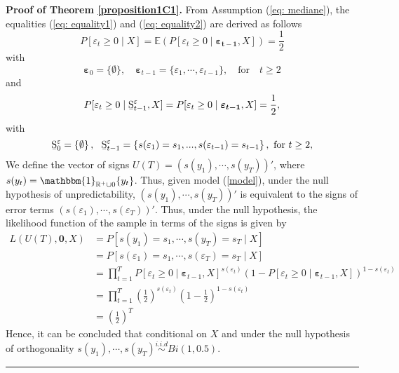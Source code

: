\documentclass[harvard,11pt]{article}
\newcommand{\E}{\mathbb{E}}
\newenvironment{proof}[1][Proof]{\textbf{#1.} }{\  \rule{0.5em}{0.5em}}
\begin{document}
\begin{proof}[Proof of Theorem \protect\ref{proposition1C1}]
 From Assumption (\ref{eq: mediane}), the equalities (\ref{eq: equality1}) and (\ref{eq: equality2}) are derived as follows
\begin{equation}\label{eq: equality1}
P[\varepsilon_t\geq0\mid X]=\E\left(P[\varepsilon_t\geq 0\mid\bm{\varepsilon_{t-1}},X ]\right)=\frac{1}{2}
\end{equation}
with
\[
\bm{\varepsilon}_0=\{\emptyset\},\quad \bm{\varepsilon}_{t-1}=\{\varepsilon_1,\cdots,\varepsilon_{t-1}\},\quad\text{for}\quad t\geq 2
\]
and
\begin{equation}\label{eq: equality2}
P[\varepsilon_t\geq0\mid \text{\b{S}}^{\varepsilon}_{t-1}, X]=P[\varepsilon_t\geq 0\mid\bm{\varepsilon_{t-1}},X ]=\frac{1}{2},
\end{equation}
with
\[
\text{\b{S}}^{\varepsilon}_{0}=\left\{ \emptyset \right\} ,\text{ \ \b{S}}^{\varepsilon}_{t-1}=\left\{
s(\varepsilon_{1})=s_{1},...,s(\varepsilon_{t-1})=s_{t-1}\right\} ,\text{ for }t\geq 2,
\]
We define the vector of signs $U(T)=(s(y_1),\cdots,s(y_T))'$, where $s(y_t)=\mathbbm{1}_{\mathbb{R}^+\cup 0}\{y_t\}$. Thus, given model (\ref{model}), under the null hypothesis of unpredictability, $(s(y_1),\cdots,s(y_T))'$ is equivalent to the signs of error terms $(s(\varepsilon_1),\cdots,s(\varepsilon_T))'$. Thus, under the null hypothesis, the likelihood function of the sample in terms of the signs is given by
\begingroup
\allowdisplaybreaks
\begin{align*}
L(U(T),\bm{0},X)&=P[s(y_1)=s_1,\cdots,s(y_T)=s_T\mid X]\\
&=P[s(\varepsilon_1)=s_1,\cdots,s(\varepsilon_T)=s_T\mid X]\\
&=\prod\limits_{t=1}^{T}P[\varepsilon_t\geq0\mid\bm{\varepsilon}_{t-1},X]^{s(\varepsilon_t)}\left(1-P[\varepsilon_t\geq0\mid\bm{\varepsilon}_{t-1},X]\right)^{1-s(\varepsilon_t)}\\
&=\prod\limits_{t=1}^{T}\left(\frac{1}{2}\right)^{s(\varepsilon_t)}\left(1-\frac{1}{2}\right)^{1-s(\varepsilon_t)}\\
&=\left(\frac{1}{2}\right)^T
\end{align*}
\endgroup
Hence, it can be concluded that conditional on $X$ and under the null hypothesis of orthogonality $s(y_1),\cdots,s(y_T)\overset{i.i.d}{\sim}Bi(1,0.5)$.
\end{proof}
\end{document}
